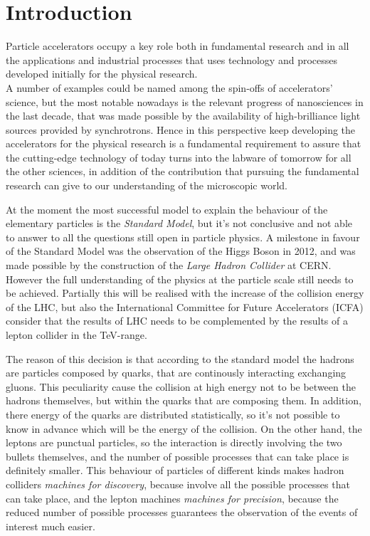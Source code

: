 \chapter{Introduction}
Particle accelerators occupy a key role both in fundamental research and in all the applications and industrial processes that uses technology and processes developed initially for the physical research.\\
A number of examples could be named among the spin-offs of accelerators' science, but the most notable nowadays is the relevant progress of nanosciences in the last decade, that was made possible by the availability of high-brilliance light sources provided by synchrotrons. Hence in this perspective keep developing the accelerators for the physical research is a fundamental requirement to assure that the cutting-edge technology of today turns into the labware of tomorrow for all the other sciences, in addition of the contribution that pursuing the fundamental research can give to our understanding of the microscopic world.


At the moment the most successful model to explain the behaviour of the elementary particles is the \textit{Standard Model}, but it's not conclusive and not able to answer to all the questions still open in particle physics. A milestone in favour of the Standard Model was the observation of the Higgs Boson in 2012, and was made possible by the construction of the \textit{Large Hadron Collider} at CERN\cite{CMS:higgs,ATLAS:higgs,LHC:design}. However the full understanding of the physics at the particle scale still needs to be achieved. Partially this will be realised with the increase of the collision energy of the LHC, but also the International Committee for Future Accelerators (ICFA) consider that the results of LHC needs to be complemented by the results of a lepton collider in the TeV-range\cite{ICFA:linStat}.

The reason of this decision is that according to the standard model the hadrons are particles composed by quarks, that are continously interacting exchanging gluons. This peculiarity cause the collision at high energy not to be between the hadrons themselves, but within the quarks that are composing them. In addition, there energy of the quarks are distributed statistically, so it's not possible to know in advance which will be the energy of the collision. On the other hand, the leptons are punctual particles, so the interaction is directly involving the two bullets themselves, and the number of possible processes that can take place is definitely smaller. 
This behaviour of particles of different kinds makes hadron colliders \textit{machines for discovery}, because involve all the possible processes that can take place, and the lepton machines \textit{machines for precision}, because the reduced number of possible processes guarantees the observation of the events of interest much easier.

